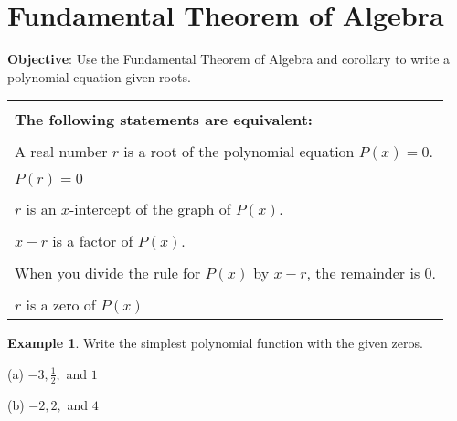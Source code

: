 \documentclass{report}
\theoremstyle{definition}
\newtheorem{example}{\bf Example}
\begin{document}
 \section{ Fundamental Theorem of Algebra  }
 \noindent \hfill\small \noindent \textbf{Objective}: Use the Fundamental Theorem of Algebra and corollary to write a polynomial equation given roots. \normalsize\\
 \setcounter{example}{0}
 \setcounter{definition}{0}

\vspace{-0.5cm}

\begin{center}
	\begin{tabular}[t]{|l|}
		\hline
		\\
		\textbf{The following statements are equivalent:}\\
		\hline
		\\
		A real number $r$ is a root of the polynomial equation $P(x)=0$.\\
		\hline
		\\
		$P(r)=0$\\
		\hline
		\\
		$r$ is an $x$-intercept of the graph of $P(x)$.\\
		\hline
		\\
		$x-r$ is a factor of $P(x)$.\\
		\hline
		\\
		When you divide the rule for $P(x)$ by $x-r$, the remainder is $0$.\\
		\hline
		\\
		$r$ is a zero of $P(x)$\\
		\hline
	\end{tabular}
\end{center}


\begin{example}
Write the simplest polynomial function with the given zeros.
\end{example}

\vspace{0.25cm}

\begin{minipage}[t]{0.45\linewidth}
(a)  $-3, \displaystyle\frac{1}{2},$ and $1$
\end{minipage}
\hfill
\begin{minipage}[t]{0.45\linewidth}
(b) $-2, 2,$ and  $4$
\end{minipage}
\end{document}
